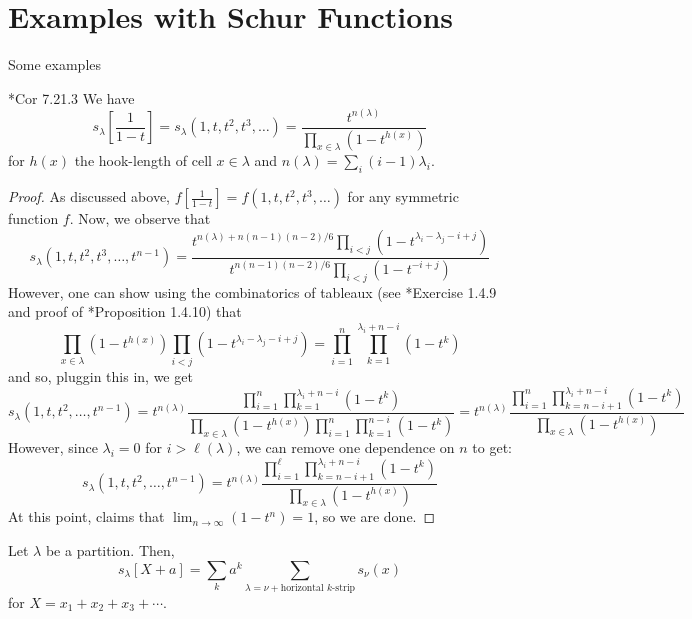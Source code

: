 \documentclass[11pt,leqno,oneside]{amsart}
\numberwithin{thm}{section}
\begin{document}
\section{Examples with Schur Functions}
Some examples
\begin{prop}
  \cite{stanley}*{Cor 7.21.3} We have \[
    s_\lambda\left[\frac{1}{1-t}\right] =
    s_\lambda(1,t,t^2,t^3,\ldots) = \frac{t^{n(\lambda)}}{\prod_{x \in
      \lambda} (1-t^{h(x)})}
\]
for \(h(x)\) the hook-length of cell \(x \in \lambda\) and
\(n(\lambda) = \sum_i (i-1)\lambda_i\).
\end{prop}
\begin{proof}
  As discussed above, \(f\left[ \frac{1}{1-t} \right] =
  f(1,t,t^2,t^3,\ldots)\) for any symmetric function \(f\). Now, 
  we observe that \[
    s_\lambda(1,t,t^2,t^3, \ldots, t^{n-1}) =
    \frac{t^{n(\lambda)+n(n-1)(n-2)/6 }\prod_{i <
          j}(1-t^{\lambda_i-\lambda_j-i+j})}{t^{n(n-1)(n-2)/6}\prod_{i<j}(1-t^{-i+j})}
    \]
    However, one can show using the combinatorics of tableaux (see
    \cite{manivel}*{Exercise 1.4.9} and proof of \cite{manivel}*{Proposition 1.4.10}) that \[
      \prod_{x \in \lambda}(1-t^{h(x)})
      \prod_{i<j}(1-t^{\lambda_i-\lambda_j-i+j}) = \prod_{i=1}^n \prod_{k=1}^{\lambda_i+n-i}(1-t^k)
    \]
    and so, pluggin this in, we get \[
      s_\lambda(1,t,t^2,\ldots,t^{n-1}) =  t^{n(\lambda)}
      \frac{\prod_{i=1}^n \prod_{k=1}^{\lambda_i+n-i}(1-t^k)}{\prod_{x
        \in \lambda} (1-t^{h(x)}) \prod_{i=1}^n
      \prod_{k=1}^{n-i}(1-t^k) } = t^{n(\lambda)} \frac{\prod_{i=1}^n
      \prod_{k=n-i+1}^{\lambda_i+n-i}(1-t^k)}{\prod_{x \in \lambda}(1-t^{h(x)})}
  \]
  However, since \(\lambda_i = 0\) for \(i > \ell(\lambda)\), we can
  remove one dependence on \(n\) to get: \[
      s_\lambda(1,t,t^2,\ldots,t^{n-1}) = t^{n(\lambda)} \frac{\prod_{i=1}^\ell
      \prod_{k=n-i+1}^{\lambda_i+n-i}(1-t^k)}{\prod_{x \in \lambda}(1-t^{h(x)})}
  \]
  At this point, \cite{stanley} claims that \(\lim_{n \to \infty}
  (1-t^{n}) = 1\), so we are done.  %
\end{proof}
\begin{prop}
  Let \(\lambda\) be a partition. Then, \[
    s_\lambda[X+a] = \sum_k a^k \sum_{\lambda = \nu+\text{horizontal }k\text{-strip}} s_\nu(x)
  \]
  for \(X = x_1+x_2+x_3+\cdots\).
\end{prop}
\end{document}
